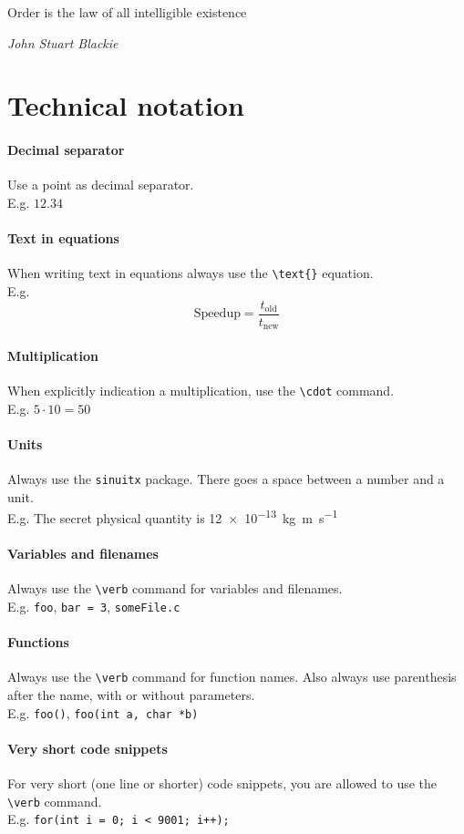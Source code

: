 \epigraph{Order is the law of all intelligible existence
}{\textit{John Stuart Blackie}}
\section{Technical notation}

\paragraph{Decimal separator}
Use a point as decimal separator. \\
E.g. $ 12.34 $

\paragraph{Text in equations}
When writing text in equations always use the \verb|\text{}| equation. \\
E.g. 
\[ \text{Speedup} = \frac{t_\text{old}}{t_\text{new}} \]

\paragraph{Multiplication}
When explicitly indication a multiplication, use the \verb|\cdot| command. \\
E.g. $ 5 \cdot 10 = 50 $

\paragraph{Units}
Always use the \verb|sinuitx| package. There goes a space between a number and a unit.\\
E.g. The secret physical quantity is \SI{12e-13}{\kilogram\metre\per\second}

\paragraph{Variables and filenames}
Always use the \verb|\verb| command for variables and filenames. \\
E.g. \verb|foo|, \verb|bar = 3|, \verb|someFile.c| 

\paragraph{Functions}
Always use the \verb|\verb| command for function names.
Also always use parenthesis after the name, with or without parameters. \\
E.g. \verb|foo()|, \verb|foo(int a, char *b)|

\paragraph{Very short code snippets}
For very short (one line or shorter) code snippets, you are allowed to use the \verb|\verb| command.\\
E.g. \verb|for(int i = 0; i < 9001; i++);|

